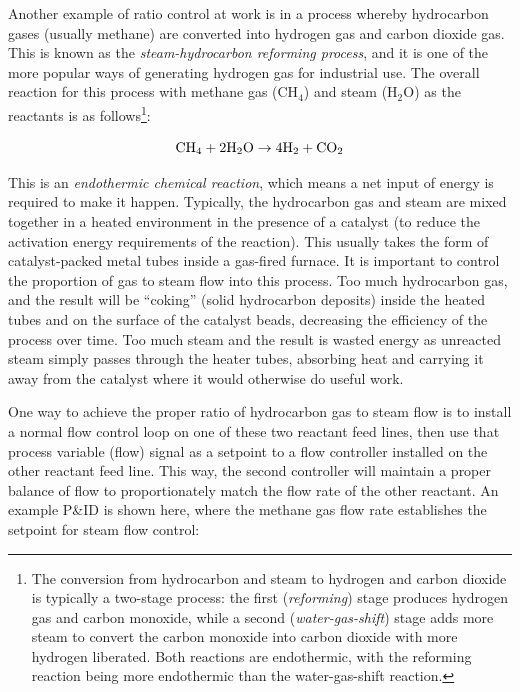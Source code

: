 \vskip 10pt

Another example of ratio control at work is in a process whereby hydrocarbon gases (usually methane) are converted into hydrogen gas and carbon dioxide gas.  This is known as the \textit{steam-hydrocarbon reforming process}, and it is one of the more popular ways of generating hydrogen gas for industrial use.  The overall reaction for this process with methane gas (CH$_{4}$) and steam (H$_{2}$O) as the reactants is as follows\footnote{The conversion from hydrocarbon and steam to hydrogen and carbon dioxide is typically a two-stage process: the first (\textit{reforming}) stage produces hydrogen gas and carbon monoxide, while a second (\textit{water-gas-shift}) stage adds more steam to convert the carbon monoxide into carbon dioxide with more hydrogen liberated.  Both reactions are endothermic, with the reforming reaction being more endothermic than the water-gas-shift reaction.}:  

$$\hbox{CH}_4 + 2\hbox{H}_2\hbox{O} \to 4\hbox{H}_2 + \hbox{CO}_2$$

This is an \textit{endothermic chemical reaction}, which means a net input of energy is required to make it happen.  Typically, the hydrocarbon gas and steam are mixed together in a heated environment in the presence of a catalyst (to reduce the activation energy requirements of the reaction).  This usually takes the form of catalyst-packed metal tubes inside a gas-fired furnace.  It is important to control the proportion of gas to steam flow into this process.  Too much hydrocarbon gas, and the result will be ``coking'' (solid hydrocarbon deposits) inside the heated tubes and on the surface of the catalyst beads, decreasing the efficiency of the process over time.  Too much steam and the result is wasted energy as unreacted steam simply passes through the heater tubes, absorbing heat and carrying it away from the catalyst where it would otherwise do useful work.

One way to achieve the proper ratio of hydrocarbon gas to steam flow is to install a normal flow control loop on one of these two reactant feed lines, then use that process variable (flow) signal as a setpoint to a flow controller installed on the other reactant feed line.  This way, the second controller will maintain a proper balance of flow to proportionately match the flow rate of the other reactant.  An example P\&ID is shown here, where the methane gas flow rate establishes the setpoint for steam flow control:

